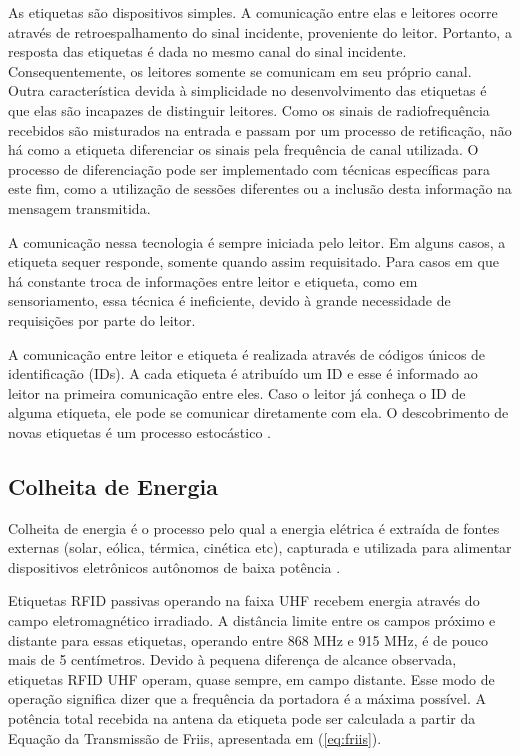 As etiquetas são dispositivos simples. A comunicação entre elas e leitores ocorre através de retroespalhamento do sinal incidente, proveniente do leitor. Portanto, a resposta das etiquetas é dada no mesmo canal do sinal incidente. Consequentemente, os leitores somente se comunicam em seu próprio canal. Outra característica devida à simplicidade no desenvolvimento das etiquetas é que elas são incapazes de distinguir leitores. Como os sinais de radiofrequência recebidos são misturados na entrada e passam por um processo de retificação, não há como a etiqueta diferenciar os sinais pela frequência de canal utilizada. O processo de diferenciação pode ser implementado com técnicas específicas para este fim, como a utilização de sessões diferentes ou a inclusão desta informação na mensagem transmitida.

A comunicação nessa tecnologia é sempre iniciada pelo leitor. Em alguns casos, a etiqueta sequer responde, somente quando assim requisitado. Para casos em que há constante troca de informações entre leitor e etiqueta, como em sensoriamento, essa técnica é ineficiente, devido à grande necessidade de requisições por parte do leitor.

A comunicação entre leitor e etiqueta é realizada através de códigos únicos de identificação (IDs). A cada etiqueta é atribuído um ID e esse é informado ao leitor na primeira comunicação entre eles. Caso o leitor já conheça o ID de alguma etiqueta, ele pode se comunicar diretamente com ela. O descobrimento de novas etiquetas é um processo estocástico \cite{YEAGER:2009}.


\subsection{Colheita de Energia}
Colheita de energia é o processo pelo qual a energia elétrica é extraída de fontes externas (solar, eólica, térmica, cinética etc), capturada e utilizada para alimentar dispositivos eletrônicos autônomos de baixa potência \cite{BEEBY:2010} \cite{PRIYA:2009}.

Etiquetas RFID passivas operando na faixa UHF recebem energia através do campo eletromagnético irradiado. A distância limite entre os campos próximo e distante para essas etiquetas, operando entre 868 MHz e 915 MHz, é de pouco mais de 5 centímetros. Devido à pequena diferença de alcance observada, etiquetas RFID UHF operam, quase sempre, em campo distante. Esse modo de operação significa dizer que a frequência da portadora é a máxima possível. A potência total recebida na antena da etiqueta pode ser calculada a partir da Equação da Transmissão de Friis, apresentada em (\ref{eq:friis}).

